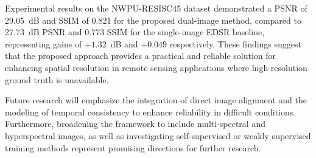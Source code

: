 \documentclass[conference]{IEEEtran}
\begin{document}
Experimental results on the NWPU-RESISC45 dataset demonstrated a PSNR of 29.05~dB and SSIM of 0.821 for the proposed dual-image method, compared to 27.73~dB PSNR and 0.773 SSIM for the single-image EDSR baseline, representing gains of $+1.32$~dB and $+0.049$ respectively. These findings suggest that the proposed approach provides a practical and reliable solution for enhancing spatial resolution in remote sensing applications where high-resolution ground truth is unavailable.

Future research will emphasize the integration of direct image alignment and the modeling of temporal consistency to enhance reliability in difficult conditions. Furthermore, broadening the framework to include multi-spectral and hyperspectral images, as well as investigating self-supervised or weakly supervised training methods represent promising directions for further research.




\end{document}
